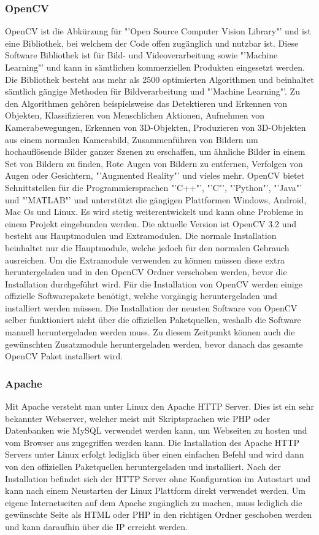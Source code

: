 \subsubsection{OpenCV}
OpenCV ist die Abkürzung für "'Open Source Computer Vision Library"' und ist eine Bibliothek, bei welchem der Code offen zugänglich und nutzbar ist. Diese Software Bibliothek ist für Bild- und Videoverarbeitung sowie "'Machine Learning"' und kann in sämtlichen kommerziellen Produkten eingesetzt werden. Die Bibliothek besteht aus mehr als 2500 optimierten Algorithmen und beinhaltet sämtlich gängige Methoden für Bildverarbeitung und "'Machine Learning"'. Zu den Algorithmen gehören beispielsweise das Detektieren und Erkennen von Objekten, Klassifizieren von Menschlichen Aktionen, Aufnehmen von Kamerabewegungen, Erkennen von 3D-Objekten, Produzieren von 3D-Objekten aus einem normalen Kamerabild, Zusammenführen von Bildern um hochauflösende Bilder ganzer Szenen zu erschaffen, um ähnliche Bilder in einem Set von Bildern zu finden, Rote Augen von Bildern zu entfernen, Verfolgen von Augen oder Gesichtern, "'Augmented Reality"' und vieles mehr. OpenCV bietet Schnittstellen für die Programmiersprachen "'C++"', "'C"', "'Python"', "'Java"' und "'MATLAB"' und unterstützt die gängigen Plattformen Windows, Android, Mac Os und Linux. Es wird stetig weiterentwickelt und kann ohne Probleme in einem Projekt eingebunden werden. Die aktuelle Version ist OpenCV 3.2 und besteht aus Hauptmodulen und Extramodulen. Die normale Installation beinhaltet nur die Hauptmodule, welche jedoch für den normalen Gebrauch ausreichen. Um die Extramodule verwenden zu können müssen diese extra heruntergeladen und in den OpenCV Ordner verschoben werden, bevor die Installation durchgeführt wird. Für die Installation von OpenCV werden einige offizielle Softwarepakete benötigt, welche vorgängig heruntergeladen und installiert werden müssen. Die Installation der neusten Software von OpenCV selber funktioniert nicht über die offiziellen Paketquellen, weshalb die Software manuell heruntergeladen werden muss. Zu diesem Zeitpunkt können auch die gewünschten Zusatzmodule heruntergeladen werden, bevor danach das gesamte OpenCV Paket installiert wird. \cite{OpenCV}

\subsubsection{Apache}
Mit Apache versteht man unter Linux den Apache HTTP Server. Dies ist ein sehr bekannter Webserver, welcher meist mit Skriptsprachen wie PHP oder Datenbanken wie MySQL verwendet werden kann, um Webseiten zu hosten und vom Browser aus zugegriffen werden kann. Die Installation des Apache HTTP Servers unter Linux erfolgt lediglich über einen einfachen Befehl und wird dann von den offiziellen Paketquellen heruntergeladen und installiert. Nach der Installation befindet sich der HTTP Server ohne Konfiguration im Autostart und kann nach einem Neustarten der Linux Plattform direkt verwendet werden. Um eigene Internetseiten auf dem Apache zugänglich zu machen, muss lediglich die gewünschte Seite als HTML oder PHP in den richtigen Ordner geschoben werden und kann daraufhin über die IP erreicht werden. \cite{Apache}